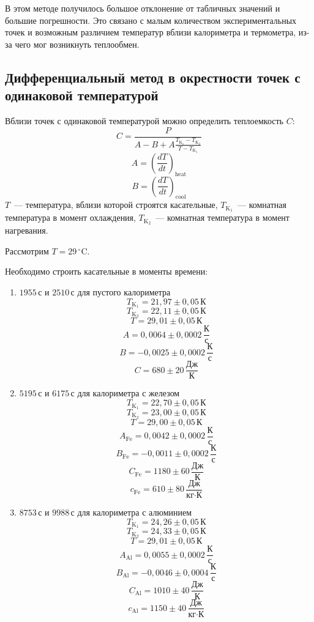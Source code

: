 \documentclass[a4paper, 12pt]{article}
\begin{document}
    В этом методе получилось большое отклонение от табличных значений и большие
    погрешности. Это связано с малым количеством экспериментальных точек и возможным
    различием температур вблизи калориметра и термометра, из-за чего мог возникнуть теплообмен.
\newpage~
\newpage
    \subsection{Дифференциальный метод в окрестности точек с одинаковой температурой}

    Вблизи точек с одинаковой температурой можно определить теплоемкость $C$:
    \[C=\frac{P}{A-B+A\frac{T_{\text{K}_1}-T_{\text{K}_2}}{T-T_{\text{K}_1}}}\]
    \[A=\left(\frac{dT}{dt}\right)_\text{heat}\]
    \[B=\left(\frac{dT}{dt}\right)_\text{cool}\]
    $T$~--- температура, вблизи которой строятся касательные, $T_{\text{K}_1}$~---
    комнатная температура в момент охлаждения, $T_{\text{K}_2}$~---
    комнатная температура в момент нагревания.

    Рассмотрим $T=29\,^\circ\text{C}$.

    Необходимо строить касательные в моменты времени:
    \begin{enumerate}
        \item $1955\,\text{с}$ и $2510\,\text{с}$ для пустого калориметра
        $$T_{\text{K}_1}=21{,}97\pm 0{,}05\,\text{К}$$
        $$T_{\text{K}_2}=22{,}11\pm 0{,}05\,\text{К}$$
        $$T=29{,}01\pm 0{,}05\,\text{К}$$
        $$A=0{,}0064\pm 0{,}0002\,\frac{\text{К}}{\text{с}}$$
        $$B=-0{,}0025\pm 0{,}0002\,\frac{\text{К}}{\text{с}}$$
        $$C=680\pm 20\,\frac{\text{Дж}}{\text{К}}$$
        \item $5195\,\text{с}$ и $6175\,\text{с}$ для калориметра с железом
        $$T_{\text{K}_1}=22{,}70\pm 0{,}05\,\text{К}$$
        $$T_{\text{K}_2}=23{,}00\pm 0{,}05\,\text{К}$$
        $$T=29{,}00\pm 0{,}05\,\text{К}$$
        $$A_\text{Fe}=0{,}0042\pm 0{,}0002\,\frac{\text{К}}{\text{с}}$$
        $$B_\text{Fe}=-0{,}0011\pm 0{,}0002\,\frac{\text{К}}{\text{с}}$$
        $$C_\text{Fe}=1180\pm 60\,\frac{\text{Дж}}{\text{К}}$$
        $$c_\text{Fe}=610\pm80\,\frac{\text{Дж}}{\text{кг}\cdot\text{К}}$$
        \item $8753\,\text{с}$ и $9988\,\text{с}$ для калориметра с алюминием
        $$T_{\text{K}_1}=24{,}26\pm 0{,}05\,\text{К}$$
        $$T_{\text{K}_2}=24{,}33\pm 0{,}05\,\text{К}$$
        $$T=29{,}01\pm 0{,}05\,\text{К}$$
        $$A_\text{Al}=0{,}0055\pm 0{,}0002\,\frac{\text{К}}{\text{с}}$$
        $$B_\text{Al}=-0{,}0046\pm 0{,}0004\,\frac{\text{К}}{\text{с}}$$
        $$C_\text{Al}=1010\pm 40\,\frac{\text{Дж}}{\text{К}}$$
        $$c_\text{Al}=1150\pm40\,\frac{\text{Дж}}{\text{кг}\cdot\text{К}}$$
    \end{enumerate}
\end{document}

